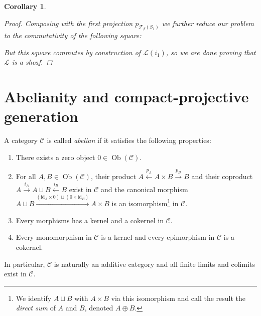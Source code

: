 \documentclass[11pt,A4]{article}
\theoremstyle{plain}
\newtheorem{cor}[thm]{Corollary}
\theoremstyle{definition}
\theoremstyle{remark}
\newcommand{\1}{\mathbbm{1}}
\newcommand{\F}{\mathcal{F}}
\renewcommand{\L}{\mathcal{L}}
\newcommand{\scrC}{\mathscr{C}}
\DeclareMathOperator{\Ob}{Ob}
\newcommand{\op}{\oplus}
\newcommand{\id}{\mathrm{id}}
\begin{document}
\begin{cor}
\begin{proof}
	Composing with the first projection $p_{\F_{\beta}(S_{1})}$ we further reduce our problem to the commutativity of the following square:
	\begin{center}
	\end{center}
	But this square commutes by construction of $\L(i_{1})$, so we are done proving that $\L$ is a sheaf.
    \end{proof}
\end{cor}

\section{Abelianity and compact-projective generation}

A category $\scrC$ is called \textit{abelian} if it satisfies the following properties:
\begin{enumerate}[label=\roman*)]
    \item There exists a zero object $0\in \Ob(\scrC)$.
    \item For all $A,B\in \Ob(\scrC)$, their product $A\xleftarrow{p_{A}} A\times B\xrightarrow{p_{B}} B$ and their coproduct $A\xrightarrow{i_{A}}A\sqcup B\xleftarrow{i_{B}} B$ exist in $\scrC$ and the canonical morphism $A\sqcup B\xrightarrow{(\id_{A}\times 0) \sqcup (0\times \id_{B})} A\times B$ is an isomorphism\footnote{We identify $A\sqcup B$ with $A\times B$ via this isomorphism and call the result the \textit{direct sum} of $A$ and $B$, denoted $A\op B$.} in $\scrC$.
    \item Every morphisms has a kernel and a cokernel in $\scrC$.
    \item Every monomorphism in $\scrC$ is a kernel and every epimorphism in $\scrC$ is a cokernel.
\end{enumerate}

In particular, $\scrC$ is naturally an additive category and all finite limits and colimits exist in $\scrC$.
\end{document}
